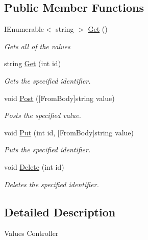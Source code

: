 \subsection*{Public Member Functions}
\begin{DoxyCompactItemize}
\item 
I\+Enumerable$<$ string $>$ \hyperlink{class_open_1_1_g_i_1_1hypermart_1_1_controllers_1_1_a_p_i_1_1_values_controller1_a8a5f7b7ca76cec5f41e04cca6ecddb3e}{Get} ()
\begin{DoxyCompactList}\small\item\em Gets all of the values \end{DoxyCompactList}\item 
string \hyperlink{class_open_1_1_g_i_1_1hypermart_1_1_controllers_1_1_a_p_i_1_1_values_controller1_a4474d8ac7e57e5c271f44870b0836259}{Get} (int id)
\begin{DoxyCompactList}\small\item\em Gets the specified identifier. \end{DoxyCompactList}\item 
void \hyperlink{class_open_1_1_g_i_1_1hypermart_1_1_controllers_1_1_a_p_i_1_1_values_controller1_a36f57a403289840e0545d8ba47ea04d2}{Post} (\mbox{[}From\+Body\mbox{]}string value)
\begin{DoxyCompactList}\small\item\em Posts the specified value. \end{DoxyCompactList}\item 
void \hyperlink{class_open_1_1_g_i_1_1hypermart_1_1_controllers_1_1_a_p_i_1_1_values_controller1_abc6ccf3b8af53263011cb0c7788dd69c}{Put} (int id, \mbox{[}From\+Body\mbox{]}string value)
\begin{DoxyCompactList}\small\item\em Puts the specified identifier. \end{DoxyCompactList}\item 
void \hyperlink{class_open_1_1_g_i_1_1hypermart_1_1_controllers_1_1_a_p_i_1_1_values_controller1_a90c5ec51ac779bf121442d6329938ee0}{Delete} (int id)
\begin{DoxyCompactList}\small\item\em Deletes the specified identifier. \end{DoxyCompactList}\end{DoxyCompactItemize}


\subsection{Detailed Description}
Values Controller 

